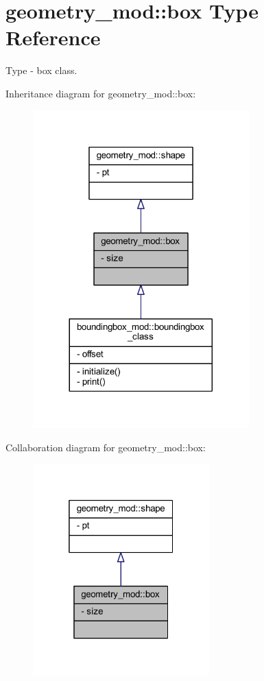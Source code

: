 \hypertarget{structgeometry__mod_1_1box}{}\section{geometry\+\_\+mod\+:\+:box Type Reference}
\label{structgeometry__mod_1_1box}


Type -\/ box class.  




Inheritance diagram for geometry\+\_\+mod\+:\+:box\+:\nopagebreak
\begin{figure}[H]
\begin{center}
\leavevmode
\includegraphics[width=236pt]{structgeometry__mod_1_1box__inherit__graph}
\end{center}
\end{figure}


Collaboration diagram for geometry\+\_\+mod\+:\+:box\+:\nopagebreak
\begin{figure}[H]
\begin{center}
\leavevmode
\includegraphics[width=193pt]{structgeometry__mod_1_1box__coll__graph}
\end{center}
\end{figure}
